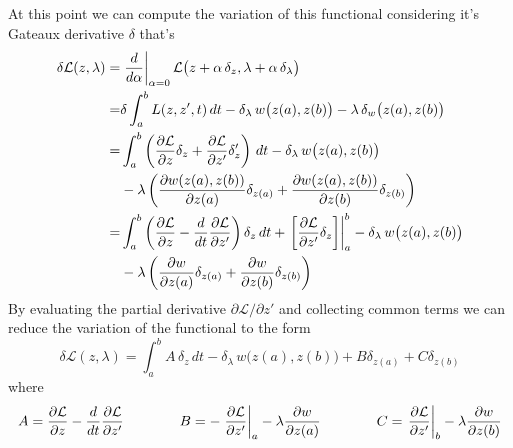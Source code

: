	At this point we can compute the variation of this functional considering it's Gateaux derivative $\delta$ that's
	\begin{align*}
		\delta \mathcal L  (z,\lambda)  =& \left.\frac{d}{d\alpha}\right|_{\alpha = 0} \mathcal L  \big(z + \alpha\, \delta_z, \lambda + \alpha\, \delta_\lambda\big) \\
		=& \delta \int_a^b L (z,z',t)\, dt - \delta_\lambda\,w\big(z(a),z(b)\big) - \lambda \, \delta_w\big(z(a),z(b)\big) \\
		=& \int_a^b \left( \frac{\partial \mathcal L  }{\partial z}\delta_z + \frac{\partial \mathcal L  }{\partial z'} \delta_z' \right) \, dt - \delta_\lambda\,w\big(z(a),z(b)\big)  \\ & - \lambda \left( \frac{\partial w(z(a),z(b))}{\partial z(a)} \delta_{z(a)} + \frac{\partial w(z(a),z(b))}{\partial z(b)} \delta_{z(b)} \right) \\
		= & \int_a^b \left( \frac{\partial \mathcal L  }{\partial z} - \frac{d}{dt} \frac{\partial \mathcal L  }{\partial z'} \right)\delta_z\, dt + \left.\left[ \frac{\partial \mathcal L  }{\partial z'}\delta_z \right]\right|_a^b - \delta_\lambda\,w\big(z(a),z(b)\big) \\ & - \lambda\left( \frac{\partial w}{\partial z(a)} \delta_{z(a)} + \frac{\partial w}{\partial z(b)} \delta_{z(b)}  \right)
	\end{align*}
	By evaluating the partial derivative $\partial \mathcal L  /\partial z'$ and collecting common terms we can reduce the variation of the functional to the form
	\[ \delta \mathcal L  (z,\lambda) = \int_a^b A\,\delta_z\, dt - \delta_\lambda\, w\big(z(a),z(b)\big) + B \delta_{z(a)} + C \delta_{z(b)} \]
	where
	\[ A = \frac{\partial \mathcal L  }{\partial z} - \frac{d}{dt} \frac{\partial \mathcal L  }{\partial z'} \qquad \qquad B = - \left.\frac{\partial \mathcal L  }{\partial z'} \right|_a - \lambda \frac{\partial w}{\partial z(a)} \qquad \qquad C = \left.\frac{\partial \mathcal L  }{\partial z'} \right|_b - \lambda \frac{\partial w}{\partial z(b)}    \]
	
